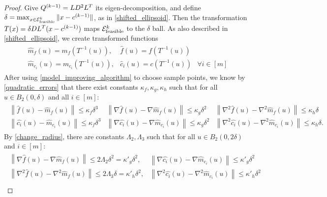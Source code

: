 \begin{proof}
Give ${Q^{(k-1)}} = LD^2L^T$ its eigen-decomposition, and define $\delta = \max_{x \in {\mathcal E^k_{\textrm{feasible}}}} \|x - {c^{(k-1)}}\|$, as in \cref{shifted_ellipsoid}.
Then the transformation $T(x) = \delta D L^T(x - {c^{(k-1)}})$ maps ${\mathcal E^k_{\textrm{feasible}}}$ to the $\delta$ ball.
As also described in \cref{shifted_ellipsoid}, we create transformed functions
\begin{align*}
\begin{array}{ccc}
\hat {m}_f(u) = m_f(T^{-1}(u)),&  \hat f (u) = f(T^{-1}(u)) &\\
\hat {m}_{c_i}(u) = m_{c_i}(T^{-1}(u)), &  \hat c_i (u) = c(T^{-1}(u))& \forall i \in [m]
\end{array}
\end{align*}
After using \cref{model_improving_algorithm} to choose sample points, we know by \cref{quadratic_errors} that
there exist constants $\kappa_f, \kappa_g, \kappa_h$ such that for all $u \in B_2(0, \delta)$ and all $i \in [m]$:
\begin{align*}
\begin{array}{ccc}
\left\| \hat {f}\left(u\right) -  \hat{m}_f\left(u\right) \right\|\le \kappa_f \delta^3 &
\left\|\nabla \hat {f}\left(u\right) - \nabla \hat{m}_f\left(u\right) \right\|\le \kappa_g \delta^2 &
\left\|\nabla^2 \hat {f}\left(u\right) - \nabla^2 \hat{m}_f\left(u\right) \right\|\le \kappa_h \delta \\
\left\| \hat {{c_i}}\left(u\right) -  \hat{m}_{c_i}\left(u\right) \right\|\le \kappa_f \delta^3 &
\left\|\nabla \hat {{c_i}}\left(u\right) - \nabla \hat{m}_{c_i}\left(u\right) \right\|\le \kappa_g \delta^2 &
\left\|\nabla^2 \hat {{c_i}}\left(u\right) - \nabla^2 \hat{m}_{c_i}\left(u\right) \right\|\le \kappa_h \delta.
\end{array}
\end{align*}
By \cref{change_radius}, there are constants $\Lambda_2, \Lambda_3$ such that for all $u \in B_2(0, 2\delta)$ and $i \in [m]$:
\begin{align*}
\begin{array}{cc}
\left\|\nabla \hat {f}\left(u\right) - \nabla \hat{m}_f\left(u\right) \right\|\le 2\Lambda_2 \delta^2 = {\kappa'}_g\delta^2, &
\left\|\nabla \hat {c_i}\left(u\right) - \nabla \hat{m}_{c_i}\left(u\right) \right\|\le {\kappa'}_g\delta^2 \\
\left\|\nabla^2 \hat {f}\left(u\right) - \nabla^2 \hat{m}_f\left(u\right) \right\|\le 2\Lambda_3 \delta = {\kappa'}_h\delta^2, &
\left\|\nabla^2 \hat {c_i}\left(u\right) - \nabla^2 \hat{m}_{c_i}\left(u\right) \right\|\le {\kappa'}_h\delta^2 \\

\end{array}
\end{align*}
\end{proof}
